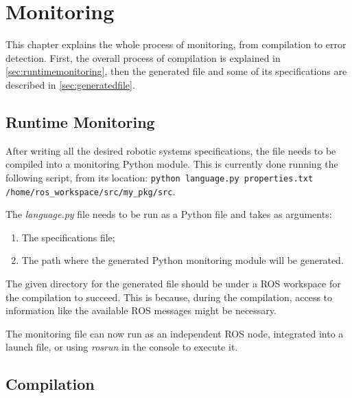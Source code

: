\chapter{Monitoring}
\label{chap:monitoring}

This chapter explains the whole process of monitoring, from compilation to error detection. First, the overall process of compilation is explained in \autoref{sec:runtimemonitoring}, then the generated file and some of its specifications are described in \autoref{sec:generatedfile}.


\section{Runtime Monitoring}
\label{sec:runtimemonitoring}

After writing all the desired robotic systems specifications, the file needs to be compiled into a monitoring Python module. This is currently done running the following script, from its location: \lstinline{python language.py properties.txt /home/ros_workspace/src/my_pkg/src}.

The \textit{language.py} file needs to be run as a Python file and takes as arguments:

\begin{enumerate}
    \item The specifications file;
    \item The path where the generated Python monitoring module will be generated.
\end{enumerate}

The given directory for the generated file should be under a ROS workspace for the compilation to succeed. This is because, during the compilation, access to information like the available ROS messages might be necessary.

The monitoring file can now run as an independent ROS node, integrated into a launch file, or using \textit{rosrun} in the console to execute it.


\section{Compilation} 
\label{sec:generatedfile}

